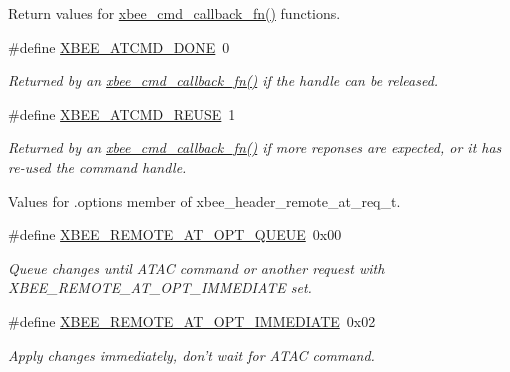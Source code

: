 \label{_amgrp01747264fe7bf50731df0522c351974e}%
Return values for \hyperlink{group__xbee__atcmd_ga9c6cda2f2b7450e8ef2f6b32d9fdcb12}{xbee\-\_\-cmd\-\_\-callback\-\_\-fn()} functions. \begin{DoxyCompactItemize}
\item 
\hypertarget{group__xbee__atcmd_gad51a6fee7843df5a5bfd6f3957465426}{\#define \hyperlink{group__xbee__atcmd_gad51a6fee7843df5a5bfd6f3957465426}{X\-B\-E\-E\-\_\-\-A\-T\-C\-M\-D\-\_\-\-D\-O\-N\-E}~0}\label{group__xbee__atcmd_gad51a6fee7843df5a5bfd6f3957465426}

\begin{DoxyCompactList}\small\item\em Returned by an \hyperlink{group__xbee__atcmd_ga9c6cda2f2b7450e8ef2f6b32d9fdcb12}{xbee\-\_\-cmd\-\_\-callback\-\_\-fn()} if the handle can be released. \end{DoxyCompactList}\item 
\#define \hyperlink{group__xbee__atcmd_ga9a5078393806d67903c87b3c82597fb1}{X\-B\-E\-E\-\_\-\-A\-T\-C\-M\-D\-\_\-\-R\-E\-U\-S\-E}~1
\begin{DoxyCompactList}\small\item\em Returned by an \hyperlink{group__xbee__atcmd_ga9c6cda2f2b7450e8ef2f6b32d9fdcb12}{xbee\-\_\-cmd\-\_\-callback\-\_\-fn()} if more reponses are expected, or it has re-\/used the command handle. \end{DoxyCompactList}\end{DoxyCompactItemize}
\label{_amgrp01747264fe7bf50731df0522c351974e}%
Values for {\ttfamily }.options member of xbee\-\_\-header\-\_\-remote\-\_\-at\-\_\-req\-\_\-t. \begin{DoxyCompactItemize}
\item 
\#define \hyperlink{group__xbee__atcmd_ga3ca0a18e4e629050e8f1387f72638f69}{X\-B\-E\-E\-\_\-\-R\-E\-M\-O\-T\-E\-\_\-\-A\-T\-\_\-\-O\-P\-T\-\_\-\-Q\-U\-E\-U\-E}~0x00
\begin{DoxyCompactList}\small\item\em Queue changes until A\-T\-A\-C command or another request with X\-B\-E\-E\-\_\-\-R\-E\-M\-O\-T\-E\-\_\-\-A\-T\-\_\-\-O\-P\-T\-\_\-\-I\-M\-M\-E\-D\-I\-A\-T\-E set. \end{DoxyCompactList}\item 
\hypertarget{group__xbee__atcmd_ga61c52828070a499e9fbfc4e6edef158b}{\#define \hyperlink{group__xbee__atcmd_ga61c52828070a499e9fbfc4e6edef158b}{X\-B\-E\-E\-\_\-\-R\-E\-M\-O\-T\-E\-\_\-\-A\-T\-\_\-\-O\-P\-T\-\_\-\-I\-M\-M\-E\-D\-I\-A\-T\-E}~0x02}\label{group__xbee__atcmd_ga61c52828070a499e9fbfc4e6edef158b}

\begin{DoxyCompactList}\small\item\em Apply changes immediately, don't wait for A\-T\-A\-C command. \end{DoxyCompactList}\end{DoxyCompactItemize}


